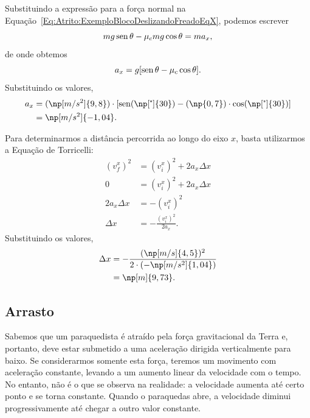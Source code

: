 Substituindo a expressão para a força normal na Equação~\eqref{Eq:Atrito:ExemploBlocoDeslizandoFreadoEqX}, podemos escrever
\begin{equation}
    mg\operatorname{sen}\theta - \mu_c mg\cos\theta = m a_x,
\end{equation}
%
de onde obtemos
\begin{equation}
    a_x = g[\operatorname{sen}\theta - \mu_c\cos\theta].
\end{equation}
%
Substituindo os valores,
\begin{align}
    a_x &= (\np[m/s^2]{9,8}) \cdot [\sen(\np[\tcdegree]{30}) - (\np{0,7})\cdot \cos(\np[\tcdegree]{30})] \\
    &= \np[m/s^2]{-1,04}.
\end{align}

Para determinarmos a distância percorrida ao longo do eixo $x$, basta utilizarmos a Equação de Torricelli:
\begin{align}
    (v_f^x)^2 &= (v_i^x)^2 + 2 a_x \Delta x \\
    0 &= (v_i^x)^2 + 2 a_x \Delta x \\
    2 a_x \Delta x &= -(v_i^x)^2 \\
    \Delta x &= -\frac{(v_i^x)^2}{2a_x}.
\end{align}
%
Substituindo os valores,
\begin{align}
    \Delta x &= -\frac{(\np[m/s]{4,5})^2}{2\cdot(-\np[m/s^2]{1,04})} \\
    &= \np[m]{9,73}.
\end{align}

\subsection{Arrasto}

Sabemos que um paraquedista é atraído pela força gravitacional da Terra e, portanto, deve estar submetido a uma aceleração dirigida verticalmente para baixo. Se considerarmos somente esta força, teremos um movimento com aceleração constante, levando a um aumento linear da velocidade com o tempo. No entanto, não é o que se observa na realidade: a velocidade aumenta até certo ponto e se torna constante. Quando o paraquedas abre, a velocidade diminui progressivamente até chegar a outro valor constante.

